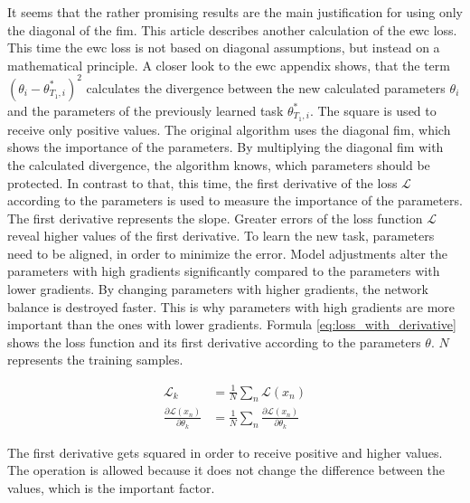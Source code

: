 It seems that the rather promising results are the main justification for using only the diagonal of the \acrshort{fim}.
\newline
This article describes another calculation of the \acrshort{ewc} loss.
This time the \acrshort{ewc} loss is not based on diagonal assumptions, but instead on a mathematical principle.
\newline
A closer look to the \acrshort{ewc} appendix shows, that the term $(\theta_i - \theta^*_{T_1,i})^2$ calculates the divergence between the new calculated parameters $\theta_i$ and the parameters of the previously learned task $\theta^*_{T_1,i}$.
The square is used to receive only positive values.
\newline
The original algorithm uses the diagonal \acrshort{fim}, which shows the importance of the parameters.
By multiplying the diagonal \acrshort{fim} with the calculated divergence, the algorithm knows, which parameters should be protected.
\newline
In contrast to that, this time, the first derivative of the loss $\mathcal{L}$ according to the parameters is used to measure the importance of the parameters.
The first derivative represents the slope.
Greater errors of the loss function  $\mathcal{L}$ reveal higher values of the first derivative.
To learn the new task, parameters need to be aligned, in order to minimize the error.
Model adjustments alter the parameters with high gradients significantly compared to the parameters with lower gradients.
By changing parameters with higher gradients, the network balance is destroyed faster.
This is why parameters with high gradients are more important than the ones with lower gradients.
\newline
Formula \ref{eq:loss_with_derivative} shows the loss function and its first derivative according to the parameters $\theta$. $N$ represents the training samples.

\begin{equation}
    \begin{split}
        \mathcal{L}_k & = 
        \frac{1}{N}
        \sum_{n} 
            \mathcal{L}(x_n)
        \\
        \frac{\partial \mathcal{L}(x_n)}{\partial \theta_k} & = 
        \frac{1}{N}
        \sum_{n} 
            \frac{\partial \mathcal{L}(x_n)}{\partial \theta_k}
    \end{split}
    \label{eq:loss_with_derivative}
\end{equation}

The first derivative gets squared in order to receive positive and higher values.
The operation is allowed because it does not change the difference between the values, which is the important factor.

